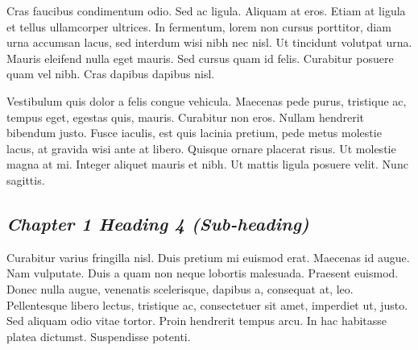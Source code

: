 Cras faucibus condimentum odio. Sed ac ligula. Aliquam at eros. Etiam at ligula et tellus ullamcorper ultrices. In fermentum, lorem non cursus porttitor, diam urna accumsan lacus, sed interdum wisi nibh nec nisl. Ut tincidunt volutpat urna. Mauris eleifend nulla eget mauris. Sed cursus quam id felis. Curabitur posuere quam vel nibh. Cras dapibus dapibus nisl.\par

Vestibulum quis dolor a felis congue vehicula. Maecenas pede purus, tristique ac, tempus eget, egestas quis, mauris. Curabitur non eros. Nullam hendrerit bibendum justo. Fusce iaculis, est quis lacinia pretium, pede metus molestie lacus, at gravida wisi ante at libero. Quisque ornare placerat risus. Ut molestie magna at mi. Integer aliquet mauris et nibh. Ut mattis ligula posuere velit. Nunc sagittis.\par

\subsection{\emph{Chapter 1 Heading 4 (Sub-heading)}}

Curabitur varius fringilla nisl. Duis pretium mi euismod erat. Maecenas id augue. Nam vulputate. Duis a quam non neque lobortis malesuada. Praesent euismod. Donec nulla augue, venenatis scelerisque, dapibus a, consequat at, leo. Pellentesque libero lectus, tristique ac, consectetuer sit amet, imperdiet ut, justo. Sed aliquam odio vitae tortor. Proin hendrerit tempus arcu. In hac habitasse platea dictumst. Suspendisse potenti.\par
